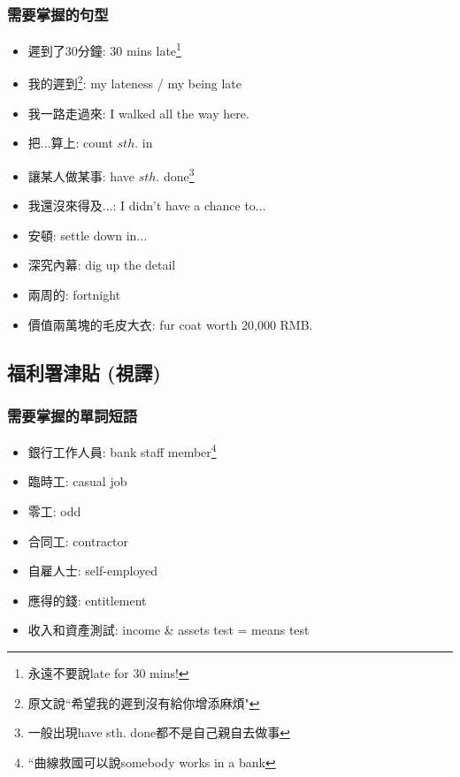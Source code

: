 \subsubsection*{需要掌握的句型}
\begin{multicols}{2}
\begin{itemize}
  \itemsep0em
  \item 遲到了30分鐘: 30 mins late\footnote{永遠不要說late for 30 mins!}
  \item 我的遲到\footnote{原文說``希望我的遲到沒有給你增添麻煩"}: my lateness / my being late
  \item 我一路走過來: I walked all the way here.
  \item 把...算上: count $sth.$ in
  \item 讓某人做某事: have $sth.$ done\footnote{一般出現have sth. done都不是自己親自去做事}
  \item 我還沒來得及...: I didn't have a chance to...
  \item 安頓: settle down in...
  \item 深究內幕: dig up the detail
  \item 兩周的: fortnight
  \item 價值兩萬塊的毛皮大衣: fur coat worth 20,000 RMB.
\end{itemize}
\end{multicols}

\subsection{福利署津貼 (視譯)}
\subsubsection*{需要掌握的單詞短語}
\begin{multicols}{2}
\begin{itemize}
  \itemsep0em
  \item 銀行工作人員: bank staff member\footnote{``曲線救國可以說somebody works in a bank}
  \item 臨時工: casual job
  \item 零工: odd
  \item 合同工: contractor
  \item 自雇人士: self-employed
  \item 應得的錢: entitlement
  \item 收入和資產測試: income \& assets test = means test
\end{itemize}
\end{multicols}

